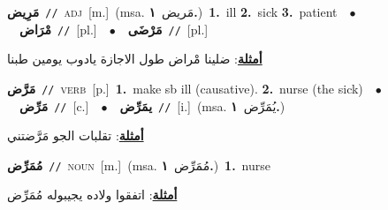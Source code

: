 \documentclass[10pt,a4paper,twoside]{article} %
\begin{document}
\begin{multicols}{2}
{\setlength\topsep{0pt}\textbf{\foreignlanguage{arabic}{مَرِيض}}\ {\color{gray}\texttt{//}\color{black}}\ \textsc{adj}\ [m.]\ \color{gray}(msa. \foreignlanguage{arabic}{مَريض}~\foreignlanguage{arabic}{\textbf{١.}})\color{black}\ \textbf{1.}~ill  \textbf{2.}~sick  \textbf{3.}~patient\ \ $\bullet$\ \ \setlength\topsep{0pt}\textbf{\foreignlanguage{arabic}{مْرَاض}}\ {\color{gray}\texttt{//}\color{black}}\ [pl.]\ \ $\bullet$\ \ \setlength\topsep{0pt}\textbf{\foreignlanguage{arabic}{مَرْضَى}}\ {\color{gray}\texttt{//}\color{black}}\ [pl.]\  \begin{flushright}\color{gray}\foreignlanguage{arabic}{\textbf{\underline{\foreignlanguage{arabic}{أمثلة}}}: ضلينا مْراض طول الاجازة يادوب يومين طبنا}\end{flushright}\color{black}} \vspace{2mm}

{\setlength\topsep{0pt}\textbf{\foreignlanguage{arabic}{مَرَّض}}\ {\color{gray}\texttt{//}\color{black}}\ \textsc{verb}\ [p.]\ \textbf{1.}~make sb ill (causative).  \textbf{2.}~nurse (the sick)\ \ $\bullet$\ \ \setlength\topsep{0pt}\textbf{\foreignlanguage{arabic}{مَرِّض}}\ {\color{gray}\texttt{//}\color{black}}\ [c.]\ \ $\bullet$\ \ \setlength\topsep{0pt}\textbf{\foreignlanguage{arabic}{يمَرِّض}}\ {\color{gray}\texttt{//}\color{black}}\ [i.]\ \color{gray}(msa. \foreignlanguage{arabic}{يُمَرِّض}~\foreignlanguage{arabic}{\textbf{١.}})\color{black}\  \begin{flushright}\color{gray}\foreignlanguage{arabic}{\textbf{\underline{\foreignlanguage{arabic}{أمثلة}}}: تقلبات الجو مَرَّضتني}\end{flushright}\color{black}} \vspace{2mm}

{\setlength\topsep{0pt}\textbf{\foreignlanguage{arabic}{مُمَرِّض}}\ {\color{gray}\texttt{//}\color{black}}\ \textsc{noun}\ [m.]\ \color{gray}(msa. \foreignlanguage{arabic}{مُمَرِّض}~\foreignlanguage{arabic}{\textbf{١.}})\color{black}\ \textbf{1.}~nurse\  \begin{flushright}\color{gray}\foreignlanguage{arabic}{\textbf{\underline{\foreignlanguage{arabic}{أمثلة}}}: اتفقوا ولاده يجيبوله مُمَرِّض}\end{flushright}\color{black}} \vspace{2mm}


\end{multicols}
\end{document}

